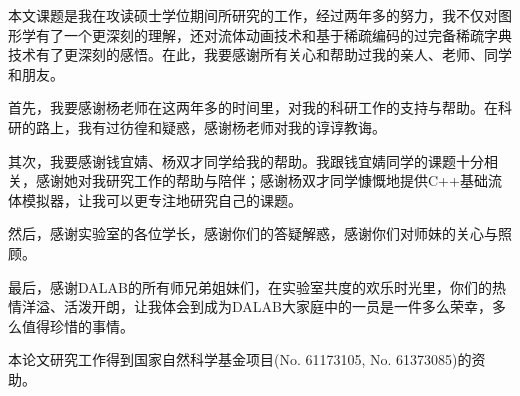 
\begin{thanks}

本文课题是我在攻读硕士学位期间所研究的工作，经过两年多的努力，我不仅对图形学有了一个更深刻的理解，还对流体动画技术和基于稀疏编码的过完备稀疏字典技术有了更深刻的感悟。在此，我要感谢所有关心和帮助过我的亲人、老师、同学和朋友。

首先，我要感谢杨老师在这两年多的时间里，对我的科研工作的支持与帮助。在科研的路上，我有过彷徨和疑惑，感谢杨老师对我的谆谆教诲。

其次，我要感谢钱宜婧、杨双才同学给我的帮助。我跟钱宜婧同学的课题十分相关，感谢她对我研究工作的帮助与陪伴；感谢杨双才同学慷慨地提供C++基础流体模拟器，让我可以更专注地研究自己的课题。

然后，感谢实验室的各位学长，感谢你们的答疑解惑，感谢你们对师妹的关心与照顾。

最后，感谢DALAB的所有师兄弟姐妹们，在实验室共度的欢乐时光里，你们的热情洋溢、活泼开朗，让我体会到成为DALAB大家庭中的一员是一件多么荣幸，多么值得珍惜的事情。

  本论文研究工作得到国家自然科学基金项目(No. 61173105, No. 61373085)的资助。

\end{thanks}
